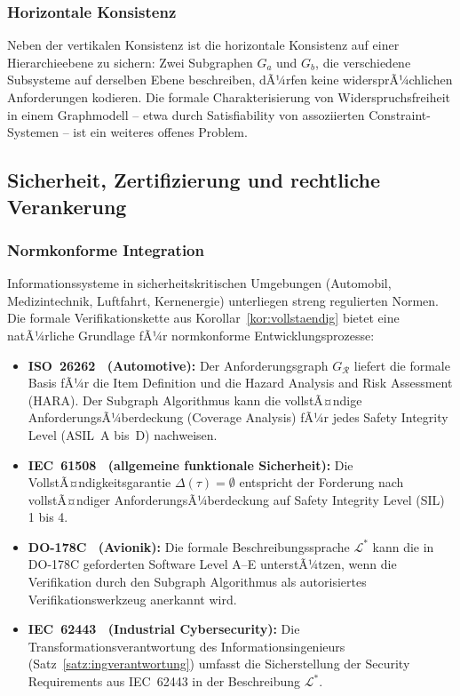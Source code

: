 ﻿\documentclass[a4paper,12pt]{article}
\theoremstyle{definition}
\begin{document}
\subsubsection{Horizontale Konsistenz}

Neben der vertikalen Konsistenz ist die horizontale Konsistenz auf einer Hierarchieebene
zu sichern: Zwei Subgraphen $G_a$ und $G_b$, die verschiedene Subsysteme auf derselben
Ebene beschreiben, dÃ¼rfen keine widersprÃ¼chlichen Anforderungen kodieren. Die formale
Charakterisierung von Widerspruchsfreiheit in einem Graphmodell -- etwa durch
Satisfiability von assoziierten Constraint-Systemen -- ist ein weiteres offenes Problem.

\subsection{Sicherheit, Zertifizierung und rechtliche Verankerung}

\subsubsection{Normkonforme Integration}

Informationssysteme in sicherheitskritischen Umgebungen (Automobil, Medizintechnik,
Luftfahrt, Kernenergie) unterliegen streng regulierten Normen.
Die formale Verifikationskette aus Korollar~\ref{kor:vollstaendig} bietet eine
natÃ¼rliche Grundlage fÃ¼r normkonforme Entwicklungsprozesse:

\begin{itemize}
  \item \textbf{ISO~26262~\cite{iso26262} (Automotive):}
        Der Anforderungsgraph $G_\mathcal{R}$ liefert die formale Basis fÃ¼r die
        Item Definition und die Hazard Analysis and Risk Assessment (HARA).
        Der Subgraph Algorithmus kann die vollstÃ¤ndige AnforderungsÃ¼berdeckung
        (Coverage Analysis) fÃ¼r jedes Safety Integrity Level (ASIL~A bis~D) nachweisen.
  \item \textbf{IEC~61508~\cite{iec61508} (allgemeine funktionale Sicherheit):}
        Die VollstÃ¤ndigkeitsgarantie $\Delta(\tau) = \emptyset$ entspricht der
        Forderung nach vollstÃ¤ndiger AnforderungsÃ¼berdeckung auf Safety Integrity
        Level (SIL) 1 bis 4.
  \item \textbf{DO-178C~\cite{do178c} (Avionik):}
        Die formale Beschreibungssprache $\mathcal{L}^*$ kann die in DO-178C
        geforderten Software Level A--E unterstÃ¼tzen, wenn die Verifikation durch
        den Subgraph Algorithmus als autorisiertes Verifikationswerkzeug anerkannt wird.
  \item \textbf{IEC~62443~\cite{iec62443} (Industrial Cybersecurity):}
        Die Transformationsverantwortung des Informationsingenieurs (Satz~\ref{satz:ingverantwortung})
        umfasst die Sicherstellung der Security Requirements aus IEC~62443 in der
        Beschreibung $\mathcal{L}^*$.
\end{itemize}
\end{document}
